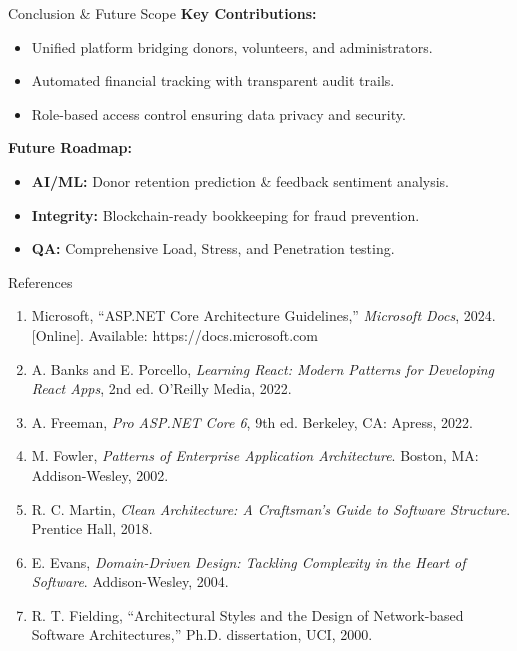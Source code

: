 \documentclass[final,hyperref={pdfpagelabels=false}]{beamer}
\newlength{\onecolwid}
\begin{document}
\begin{frame}[t]
\begin{columns}[t]
\begin{column}{\onecolwid}
\begin{block}{\Large Conclusion \& Future Scope}
\textbf{Key Contributions:}
\begin{itemize}
    \item Unified platform bridging donors, volunteers, and administrators.
    \item Automated financial tracking with transparent audit trails.
    \item Role-based access control ensuring data privacy and security.
\end{itemize}

\textbf{Future Roadmap:}
\begin{itemize}
    \item \textbf{AI/ML:} Donor retention prediction \& feedback sentiment analysis.
    \item \textbf{Integrity:} Blockchain-ready bookkeeping for fraud prevention.
    \item \textbf{QA:} Comprehensive Load, Stress, and Penetration testing.
\end{itemize}
\end{block}

\vskip0.1cm

\begin{block}{\Large References}
\justify
\scriptsize
\begin{enumerate}
    \item[{[1]}] Microsoft, ``ASP.NET Core Architecture Guidelines,'' \textit{Microsoft Docs}, 2024. [Online]. Available: https://docs.microsoft.com
    \item[{[2]}] A. Banks and E. Porcello, \textit{Learning React: Modern Patterns for Developing React Apps}, 2nd ed. O'Reilly Media, 2022.
    \item[{[3]}] A. Freeman, \textit{Pro ASP.NET Core 6}, 9th ed. Berkeley, CA: Apress, 2022.
    \item[{[4]}] M. Fowler, \textit{Patterns of Enterprise Application Architecture}. Boston, MA: Addison-Wesley, 2002.
    \item[{[5]}] R. C. Martin, \textit{Clean Architecture: A Craftsman's Guide to Software Structure}. Prentice Hall, 2018.
    \item[{[6]}] E. Evans, \textit{Domain-Driven Design: Tackling Complexity in the Heart of Software}. Addison-Wesley, 2004.
    \item[{[7]}] R. T. Fielding, ``Architectural Styles and the Design of Network-based Software Architectures,'' Ph.D. dissertation, UCI, 2000.
\end{enumerate}
\end{block}


\end{column}
\end{columns}
\end{frame}
\end{document}
